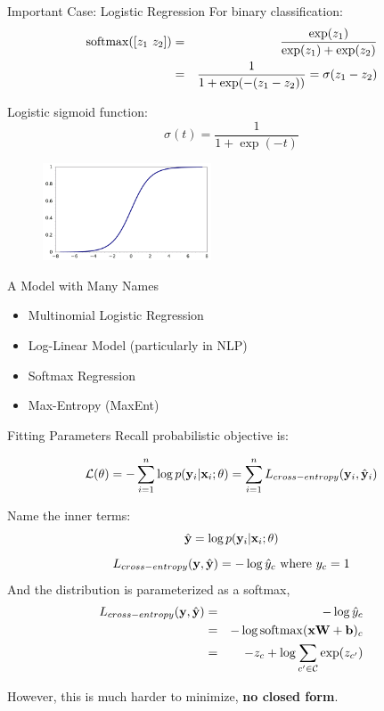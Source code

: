 \documentclass{beamer}
\begin{document}
\begin{frame}{Important Case: Logistic Regression}
  For binary classification:
  \begin{eqnarray*}
   \softmax([z_1\ z_2]) &=& \frac{\exp(z_1)}{\exp(z_1) + \exp(z_2)} \\
 &=& \frac{1}{1 + \exp(-(z_1-z_2))} = \sigma(z_1 -z_2)
  \end{eqnarray*}

  Logistic sigmoid function:
  \[\sigma(t) = \frac{1}{1 + \exp(-t)} \]
  \begin{figure}
    \centering
    \includegraphics[width=5cm]{sigmoid}
  \end{figure}
\end{frame}

\begin{frame}{A Model with Many Names}
  \begin{itemize}
  \item  Multinomial Logistic Regression

  \item Log-Linear Model (particularly in NLP)

  \item Softmax Regression

  \item Max-Entropy (MaxEnt)
  \end{itemize}
\end{frame}





\begin{frame}{Fitting Parameters}
  Recall probabilistic objective is:

  \[ \mathcal{L}(\theta) =  - \sum_{i=1}^n \log p(\mathbf{y}_i | \mathbf{x}_i; \theta) = \sum_{i=1}^n L_{cross-entropy}(\mathbf{y}_i, \hat{\mathbf{y}}_i) \] 

  Name the inner terms:
  \[ \hat{\mathbf{y}} = \log p(\mathbf{y}_i | \mathbf{x}_i; \theta) \]
    \[ L_{cross-entropy}(\mathbf{y}, \hat{\mathbf{y}})= - \log \hat{y}_c \mathrm{\ where\ }y_c = 1   \]
  And the distribution is parameterized as a softmax,
  \begin{eqnarray*}
    L_{cross-entropy}(\boldy, \hat{\boldy}) &=& - \log \hat{y}_c\\
    &=& -\log \softmax(\boldx \boldW + \bold b)_c \\
    &=& - z_c + \log \sum_{c' \in \mcC} \exp(z_{c'}) 
  \end{eqnarray*}

  However, this is much harder to minimize, \textbf{no closed form}.
  
\end{frame}
\end{document}
